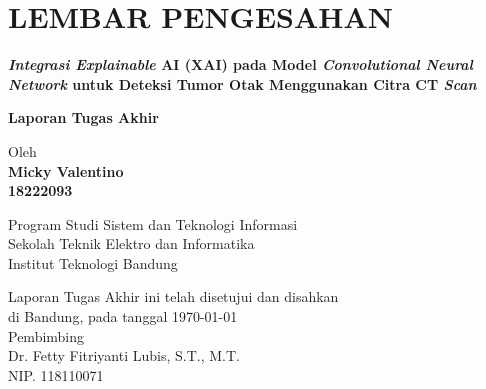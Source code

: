 \chapter*{LEMBAR PENGESAHAN}


\begin{center}
    \vspace{1cm}
	{\Large\bfseries \textit{Integrasi Explainable} AI (XAI) pada Model \textit{Convolutional Neural Network} untuk Deteksi Tumor Otak Menggunakan Citra CT \textit{Scan}}\\
     \vspace{1cm}

  {\Large \textbf{Laporan Tugas Akhir}}\\


  \vspace{1.5cm}
    
    
  {\large Oleh}\\[0.3cm]
    \textbf{
    {\large Micky Valentino}\\
    {\large 18222093}
  }\\
    
  \vspace{0.5cm}
 
  {\large Program Studi Sistem dan Teknologi Informasi}\\
  {\large Sekolah Teknik Elektro dan Informatika}\\
  {\large Institut Teknologi Bandung}\\

  \vspace{1.5cm}

  Laporan Tugas Akhir ini telah disetujui dan disahkan\\ 
  di Bandung, pada tanggal \today\\[1cm]

	Pembimbing  \\[3cm]
	Dr. Fetty Fitriyanti Lubis, S.T., M.T.   \\[0.1cm]
	NIP. 118110071

\end{center}

\vspace{1cm}
\noindent



